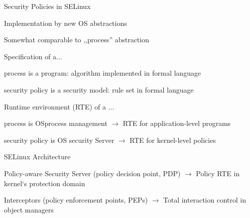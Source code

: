 \documentclass[a4paper]{article}
\begin{document}
\begin{multicols}{3}
    Security Policies in SELinux
    \begin{itemize*}
        \item Implementation by new OS abstractions
        \item Somewhat comparable to ,,process'' abstraction
        \item Specification of a...
        \begin{itemize*}
            \item process is a program: algorithm implemented in formal language
            \item security policy is a security model: rule set in formal language
        \end{itemize*}
        \item Runtime environment (RTE) of a ...
        \begin{itemize*}
            \item process is OSprocess management $\rightarrow$ RTE for application-level programs
            \item security policy is OS security Server $\rightarrow$ RTE for kernel-level policies
        \end{itemize*}
    \end{itemize*}

    SELinux Architecture
    \begin{itemize*}
        \item Policy-aware Security Server (policy decision point, PDP) $\rightarrow$ Policy RTE in kernel‘s protection domain
        \item Interceptors (policy enforcement points, PEPs) $\rightarrow$ Total interaction control in object managers
    \end{itemize*}


\end{multicols}
\end{document}
